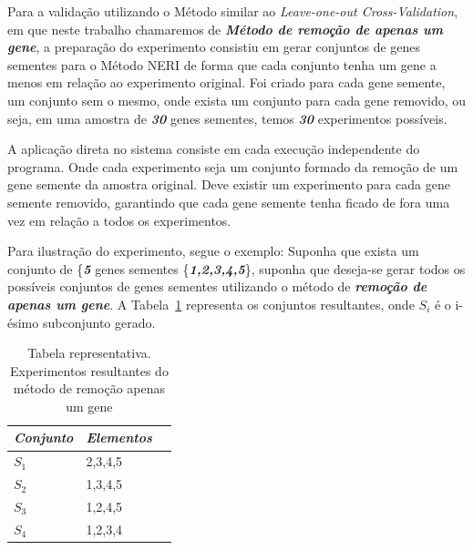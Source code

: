 Para a validação utilizando o Método similar ao \textsl{Leave-one-out Cross-Validation}, em que neste trabalho chamaremos de \textsl{\textbf{Método de remoção de apenas um gene}}, a preparação do experimento consistiu em gerar conjuntos de genes sementes para o Método NERI de forma que cada conjunto tenha um gene a menos em relação ao experimento original. Foi criado para cada gene semente, um conjunto sem o mesmo, onde exista um conjunto para cada gene removido, ou seja, em uma amostra de \textsl{\textbf{30}} genes sementes, temos \textsl{\textbf{30}} experimentos possíveis.

A aplicação direta no sistema consiste em cada execução independente do programa. Onde cada experimento seja um conjunto formado da remoção de um gene semente da amostra original. Deve existir um experimento para cada gene semente removido, garantindo que cada gene semente tenha ficado de fora uma vez em relação a todos os experimentos.



%
Para ilustração do experimento, segue o exemplo: Suponha que exista um conjunto de \{\textsl{\textbf{5}} genes sementes \{\textsl{\textbf{1,2,3,4,5}}\}, suponha que deseja-se gerar todos os possíveis conjuntos de genes sementes utilizando o método de \textsl{\textbf{remoção de apenas um gene}}.
A Tabela~\ref{table_loo_example} representa os conjuntos resultantes, onde \textsl{\textbf{$S_i$}} é o i-ésimo subconjunto gerado.

%
\begin{table}[]
\centering
\caption{Tabela representativa. Experimentos resultantes do método de remoção apenas um gene}
\label{table_loo_example}
\begin{tabular}{@{}lll@{}}
\toprule
\textbf{\textsl{Conjunto}} & \textbf{\textsl{Elementos}} \\ \midrule
\textsl{\textbf{$S_1$}} & 2,3,4,5 \\
\textsl{\textbf{$S_2$}} & 1,3,4,5 \\
\textsl{\textbf{$S_3$}} & 1,2,4,5 \\
\textsl{\textbf{$S_4$}} & 1,2,3,4 \\ \bottomrule
\end{tabular}
\end{table}
%

